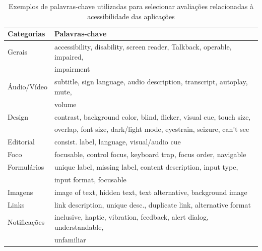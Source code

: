 \begin{table}[!htb]
\small
\caption{Exemplos de palavras-chave utilizadas para selecionar avaliações relacionadas à acessibilidade das aplicações}
\label{tab:keywords}
\begin{tabular}{|l|l|}
\hline
Categorias & Palavras-chave \\
\hline
Gerais                    & accessibility, disability, screen reader, Talkback, operable, impaired, 
\\& impairment                                               \\

\hline
Áudio/Vídeo             & subtitle, sign language, audio description,
 transcript, autoplay, mute, \\& volume                                                 \\

\hline
Design                      & contrast, background color, blind, flicker,
 visual cue, touch size, \\&overlap, font size, 
 dark/light mode, eyestrain, seizure, can't see \\

\hline
Editorial                   & consist. label, language, visual/audio cue                                                                \\

\hline
Foco                       & focusable, control focus, keyboard trap, 
 focus order, navigable                        \\

\hline
Formulários                       & unique label, missing label, content description,
 input type, \\& input format, focusable                                                                        \\

\hline
Imagens                      & image of text, hidden text, text alternative,
background image                                                                                               \\

\hline
Links                       & link description, unique desc., duplicate
link, alternative format \\

\hline
Notificações               & inclusive, haptic, vibration, feedback, alert 
 dialog, understandable, \\& unfamiliar                                                                             \\


\end{tabular}
\end{table}
